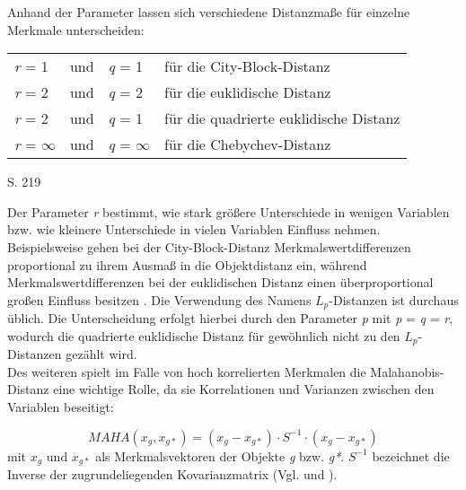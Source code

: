 Anhand der Parameter lassen sich verschiedene Distanzmaße für einzelne Merkmale unterscheiden: 
\begin{center}
\begin{tabular}{lcll}
	\textit{r} = 1 & und & \textit{q} = 1 & für die City-Block-Distanz \\
	\textit{r} = 2 & und & \textit{q} = 2 & für die euklidische Distanz \\
	\textit{r} = 2 & und & \textit{q} = 1 & für die quadrierte euklidische Distanz \\
	\textit{r} = $\infty$ & und & \textit{q} = $\infty$ & für die Chebychev-Distanz \\
\end{tabular}
\end{center}
\cite{Bacher.2010} S. 219

Der Parameter \textit{r} bestimmt, wie stark größere Unterschiede in wenigen Variablen bzw. wie kleinere Unterschiede in vielen Variablen Einfluss nehmen. Beispielsweise gehen bei der City-Block-Distanz Merkmalswertdifferenzen proportional zu ihrem Ausmaß in die Objektdistanz ein, während Merkmalswertdifferenzen bei der euklidischen Distanz einen überproportional großen Einfluss besitzen \citep[Vgl.][S. 212]{Eckey.2002}. Die Verwendung des Namens $L_p$-Distanzen ist durchaus üblich. Die Unterscheidung erfolgt hierbei durch den Parameter \textit{p} mit \textit{p} = \textit{q} = \textit{r}, wodurch die quadrierte euklidische Distanz für gewöhnlich nicht zu den $L_p$-Distanzen gezählt wird. \\

Des weiteren spielt im Falle von hoch korrelierten Merkmalen die Malahanobis-Distanz eine wichtige Rolle, da sie Korrelationen und Varianzen zwischen den Variablen beseitigt:

\begin{equation}
MAHA(x_{g},x_{g*}) = (x_{g} - x_{g*}) \cdot S^{-1} \cdot (x_{g} - x_{g*})
\end{equation}
mit $x_{g}$ und $x_{g*}$ als Merkmalsvektoren der Objekte \textit{g} bzw. \textit{g*}. $S^{-1}$ bezeichnet die Inverse der zugrundeliegenden Kovarianzmatrix (Vgl. \citealt[S. 339]{Bacher.2010} und \citealt[S. 168]{Bankhofer.2008}).
